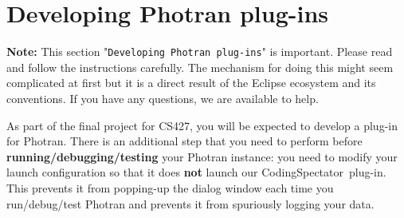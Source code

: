 \documentclass{article}
\newcommand\codspec{CodingSpectator}
\newcommand\warnnote[1]{\textbf{Note: }#1}
\newcommand\uiref[1]{"\texttt{#1}"}
\begin{document}
\section{Developing Photran plug-ins}

\warnnote{This section \uiref{Developing Photran plug-ins} is important. Please
read and follow the instructions carefully. The mechanism for doing this might
seem complicated at first but it is a direct result of the Eclipse ecosystem and
its conventions. If you have any questions, we are available to help.}

As part of the final project for CS427, you will be expected to develop a
plug-in for Photran. There is an additional step that you need to perform before
\textbf{running/debugging/testing} your Photran instance: you need to modify
your launch configuration so that it does \textbf{not} launch our \codspec\
plug-in.  This prevents it from popping-up the dialog window each time you
run/debug/test Photran and prevents it from spuriously logging your data.
\end{document}
